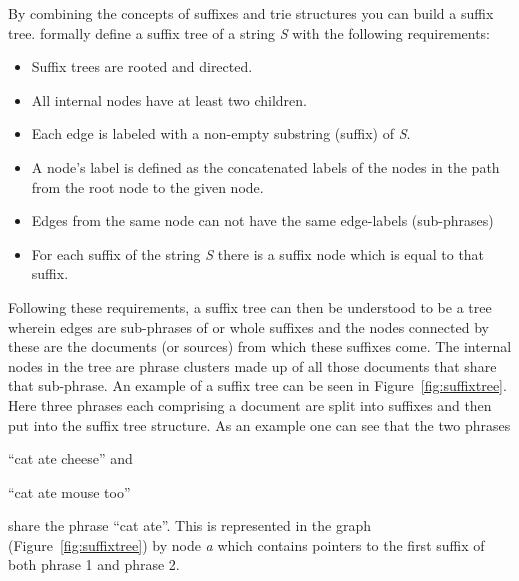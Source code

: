 By combining the concepts of suffixes and trie structures you can build a suffix tree. \cite{Oren1998} formally define a suffix tree of a string \textit{S} with the following requirements:
\begin{itemize}
\item Suffix trees are rooted and directed.
\item All internal nodes have at least two children.
\item Each edge is labeled with a non-empty substring (suffix) of \textit{S}.
\item A node's label is defined as the concatenated labels of the nodes in the path from the root node to the given node.
\item Edges from the same node can not have the same edge-labels (sub-phrases)
\item For each suffix of the string \textit{S} there is a suffix node which is equal to that suffix.
\end{itemize}

Following these requirements, a suffix tree can then be understood to be a tree wherein edges are sub-phrases of or whole suffixes and the nodes connected by these are the documents (or sources) from which these suffixes come. The internal nodes in the tree are phrase clusters made up of all those documents that share that sub-phrase. An example of a suffix tree can be seen in Figure~\ref{fig:suffixtree}. Here three phrases each comprising a document are split into suffixes and then put into the suffix tree structure. As an example one can see that the two phrases
\begin{inparaenum}[\itshape 1\upshape)]
\item ``cat ate cheese'' and
\item ``cat ate mouse too''
\end{inparaenum}
share the phrase ``cat ate''. This is represented in the graph (Figure~\ref{fig:suffixtree}) by node \textit{a} which contains pointers to the first suffix of both phrase 1 and phrase 2.

